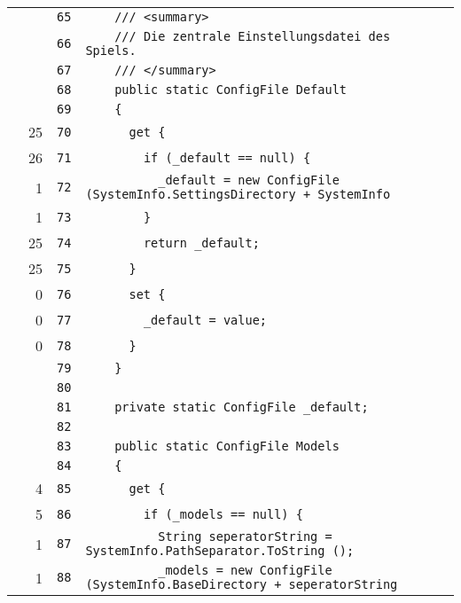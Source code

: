 \documentclass[a4paper,10pt]{article}
\begin{document}
\begin{longtable}[l]{lrrl}
\cellcolor{gray} &  & \verb~65~ & \verb~    /// <summary>~\\
\cellcolor{gray} &  & \verb~66~ & \verb~    /// Die zentrale Einstellungsdatei des Spiels.~\\
\cellcolor{gray} &  & \verb~67~ & \verb~    /// </summary>~\\
\cellcolor{gray} &  & \verb~68~ & \verb~    public static ConfigFile Default~\\
\cellcolor{gray} &  & \verb~69~ & \verb~    {~\\
\cellcolor{green} & 25 & \verb~70~ & \verb~      get {~\\
\cellcolor{green} & 26 & \verb~71~ & \verb~        if (_default == null) {~\\
\cellcolor{green} & 1 & \verb~72~ & \verb~          _default = new ConfigFile (SystemInfo.SettingsDirectory + SystemInfo~\\
\cellcolor{green} & 1 & \verb~73~ & \verb~        }~\\
\cellcolor{green} & 25 & \verb~74~ & \verb~        return _default;~\\
\cellcolor{green} & 25 & \verb~75~ & \verb~      }~\\
\cellcolor{red} & 0 & \verb~76~ & \verb~      set {~\\
\cellcolor{red} & 0 & \verb~77~ & \verb~        _default = value;~\\
\cellcolor{red} & 0 & \verb~78~ & \verb~      }~\\
\cellcolor{gray} &  & \verb~79~ & \verb~    }~\\
\cellcolor{gray} &  & \verb~80~ & \verb~~\\
\cellcolor{gray} &  & \verb~81~ & \verb~    private static ConfigFile _default;~\\
\cellcolor{gray} &  & \verb~82~ & \verb~~\\
\cellcolor{gray} &  & \verb~83~ & \verb~    public static ConfigFile Models~\\
\cellcolor{gray} &  & \verb~84~ & \verb~    {~\\
\cellcolor{green} & 4 & \verb~85~ & \verb~      get {~\\
\cellcolor{green} & 5 & \verb~86~ & \verb~        if (_models == null) {~\\
\cellcolor{green} & 1 & \verb~87~ & \verb~          String seperatorString = SystemInfo.PathSeparator.ToString ();~\\
\cellcolor{green} & 1 & \verb~88~ & \verb~          _models = new ConfigFile (SystemInfo.BaseDirectory + seperatorString~\\

\end{longtable}
\end{document}
